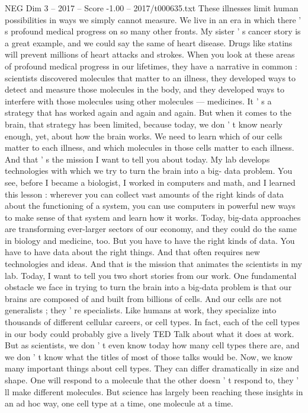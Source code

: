 \begin{textsample}{NEG Dim 3 – 2017 – Score -1.00 – 2017/t000635.txt}
These illnesses limit human possibilities in ways we simply cannot measure.
We live in an era in which there ' s profound medical progress on so many other fronts.
My sister ' s cancer story is a great example, and we could say the same of heart disease.
Drugs like statins will prevent millions of heart attacks and strokes.
When you look at these areas of profound medical progress in our lifetimes, they have a narrative in common : scientists discovered molecules that matter to an illness, they developed ways to detect and measure those molecules in the body, and they developed ways to interfere with those molecules using other molecules — medicines.
It ' s a strategy that has worked again and again and again.
But when it comes to the brain, that strategy has been limited, because today, we don ' t know nearly enough, yet, about how the brain works.
We need to learn which of our cells matter to each illness, and which molecules in those cells matter to each illness.
And that ' s the mission I want to tell you about today.
My lab develops technologies with which we try to turn the brain into a big- data problem.
You see, before I became a biologist, I worked in computers and math, and I learned this lesson : wherever you can collect vast amounts of the right kinds of data about the functioning of a system, you can use computers in powerful new ways to make sense of that system and learn how it works.
Today, big-data approaches are transforming ever-larger sectors of our economy, and they could do the same in biology and medicine, too.
But you have to have the right kinds of data.
You have to have data about the right things.
And that often requires new technologies and ideas.
And that is the mission that animates the scientists in my lab.
Today, I want to tell you two short stories from our work.
One fundamental obstacle we face in trying to turn the brain into a big-data problem is that our brains are composed of and built from billions of cells.
And our cells are not generalists ; they ' re specialists.
Like humans at work, they specialize into thousands of different cellular careers, or cell types.
In fact, each of the cell types in our body could probably give a lively TED Talk about what it does at work.
But as scientists, we don ' t even know today how many cell types there are, and we don ' t know what the titles of most of those talks would be.
Now, we know many important things about cell types.
They can differ dramatically in size and shape.
One will respond to a molecule that the other doesn ' t respond to, they ' ll make different molecules.
But science has largely been reaching these insights in an ad hoc way, one cell type at a time, one molecule at a time.

\end{textsample}
